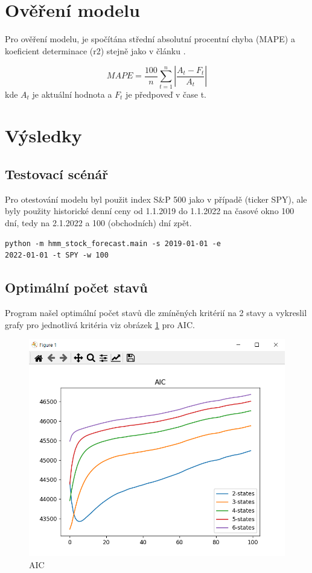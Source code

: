 \section{Ověření modelu}

Pro ověření modelu, je spočítána střední absolutní procentní chyba (MAPE) a koeficient determinace (r2) stejně jako v článku \cite{Hassan}.

\[ MAPE = \frac{100}{n}\displaystyle{\sum_{t=1}^{n} |\frac{A_t-F_t}{A_t}|} \]
kde \(A_t\) je aktuální hodnota a \(F_t\) je předpoveď v čase t.

\clearpage

\section{Výsledky}

\subsection{Testovací scénář}

Pro otestování modelu byl použit index S\&P 500 jako v případě \cite{Nguyen} (ticker SPY), ale byly použity historické denní
ceny od 1.1.2019 do 1.1.2022 na časové okno 100 dní, tedy na 2.1.2022 a 100 (obchodních) dní zpět.
\begin{lstlisting}
python -m hmm_stock_forecast.main -s 2019-01-01 -e
2022-01-01 -t SPY -w 100
\end{lstlisting}

\subsection{Optimální počet stavů}
Program našel optimální počet stavů dle zmíněných kritérií na 2 stavy a vykreslil grafy pro jednotlivá kritéria
viz obrázek \ref{fig:aic} pro AIC.

\begin{figure}[h]
    \includegraphics[width=1\textwidth]{img/aic}
    \caption{AIC}
    \label{fig:aic}
\end{figure}

